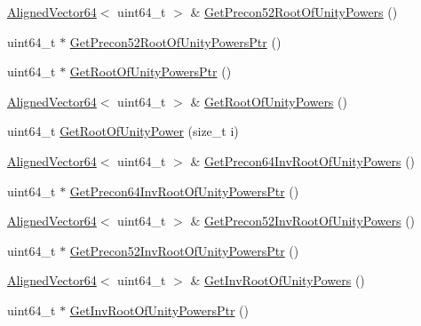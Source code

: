 \begin{DoxyCompactItemize}
\item 
\hyperlink{namespacehetest_1_1utils_ad5b6a78d49dc8f6790f7fd2b10bf3db0}{Aligned\-Vector64}$<$ uint64\-\_\-t $>$ \& \hyperlink{classhetest_1_1utils_1_1NTT_1_1NTTImpl_a1d155bcada1c332280941f5e082319a6}{Get\-Precon52\-Root\-Of\-Unity\-Powers} ()
\item 
uint64\-\_\-t $\ast$ \hyperlink{classhetest_1_1utils_1_1NTT_1_1NTTImpl_a7c77eaeda15cabc6d3c2868ff796b79f}{Get\-Precon52\-Root\-Of\-Unity\-Powers\-Ptr} ()
\item 
uint64\-\_\-t $\ast$ \hyperlink{classhetest_1_1utils_1_1NTT_1_1NTTImpl_a1f6d65ead7d22cbec7f985d6a9575ae6}{Get\-Root\-Of\-Unity\-Powers\-Ptr} ()
\item 
\hyperlink{namespacehetest_1_1utils_ad5b6a78d49dc8f6790f7fd2b10bf3db0}{Aligned\-Vector64}$<$ uint64\-\_\-t $>$ \& \hyperlink{classhetest_1_1utils_1_1NTT_1_1NTTImpl_a000757a957e7f530a4aa65018e2c3406}{Get\-Root\-Of\-Unity\-Powers} ()
\item 
uint64\-\_\-t \hyperlink{classhetest_1_1utils_1_1NTT_1_1NTTImpl_adc89766c94e7c6dd13d08d712daec265}{Get\-Root\-Of\-Unity\-Power} (size\-\_\-t i)
\item 
\hyperlink{namespacehetest_1_1utils_ad5b6a78d49dc8f6790f7fd2b10bf3db0}{Aligned\-Vector64}$<$ uint64\-\_\-t $>$ \& \hyperlink{classhetest_1_1utils_1_1NTT_1_1NTTImpl_a7b051fcc87e3f6f6df01b0d55e462777}{Get\-Precon64\-Inv\-Root\-Of\-Unity\-Powers} ()
\item 
uint64\-\_\-t $\ast$ \hyperlink{classhetest_1_1utils_1_1NTT_1_1NTTImpl_a04d04b88f14f5e79e5fb529f624559a1}{Get\-Precon64\-Inv\-Root\-Of\-Unity\-Powers\-Ptr} ()
\item 
\hyperlink{namespacehetest_1_1utils_ad5b6a78d49dc8f6790f7fd2b10bf3db0}{Aligned\-Vector64}$<$ uint64\-\_\-t $>$ \& \hyperlink{classhetest_1_1utils_1_1NTT_1_1NTTImpl_a60f96251a7f9f4876fa5a551cd4c894e}{Get\-Precon52\-Inv\-Root\-Of\-Unity\-Powers} ()
\item 
uint64\-\_\-t $\ast$ \hyperlink{classhetest_1_1utils_1_1NTT_1_1NTTImpl_af1bff60ad77232663df6c504b15cbe14}{Get\-Precon52\-Inv\-Root\-Of\-Unity\-Powers\-Ptr} ()
\item 
\hyperlink{namespacehetest_1_1utils_ad5b6a78d49dc8f6790f7fd2b10bf3db0}{Aligned\-Vector64}$<$ uint64\-\_\-t $>$ \& \hyperlink{classhetest_1_1utils_1_1NTT_1_1NTTImpl_a2afafd91a75934c0b004fcacb52506d0}{Get\-Inv\-Root\-Of\-Unity\-Powers} ()
\item 
uint64\-\_\-t $\ast$ \hyperlink{classhetest_1_1utils_1_1NTT_1_1NTTImpl_a2eb4f6dc13583dfa039aff9c86090b8b}{Get\-Inv\-Root\-Of\-Unity\-Powers\-Ptr} ()

\end{DoxyCompactItemize}
